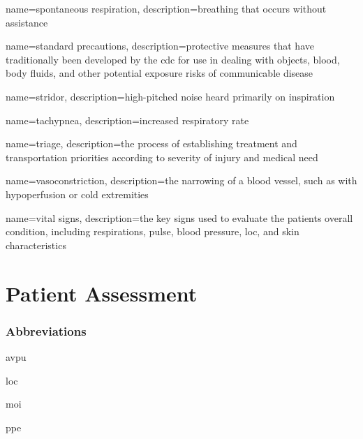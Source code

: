 \documentclass[../../EMT-169.tex]{subfiles}
\begin{document}
	{
		name=spontaneous respiration,
		description={breathing that occurs without assistance}
	}

	{
		name=standard precautions,
		description={protective measures that have traditionally been developed by the \acrfull{cdc} for use in dealing with objects, blood, body fluids, and other potential exposure risks of communicable disease}
	}
	
	{
		name=stridor,
		description={high-pitched noise heard primarily on inspiration}
	}
	
	{
		name=tachypnea,
		description={increased respiratory rate}
	}
	
	{
		name=triage,
		description={the process of establishing treatment and transportation priorities according to severity of injury and medical need}
	}

	{
		name=vasoconstriction,
		description={the narrowing of a blood vessel, such as with hypoperfusion or cold extremities}
	}	

	{
		name=vital signs,
		description={the key signs used to evaluate the patients overall condition, including respirations, pulse, blood pressure, \acrfull{loc}, and skin characteristics}
	}

	
\chapter{Patient Assessment}

\subsection*{Abbreviations}
\begin{description}[leftmargin=!,labelwidth=\widthof{\bfseries ABCDEF}]
	\item [\acrshort{avpu}] 		\acrlong{avpu}
	\item [\acrshort{loc}] 			\acrlong{loc}
	\item [\acrshort{moi}] 			\acrlong{moi}
	\item [\acrshort{ppe}] 			\acrlong{ppe}
\end{description}\hfill \\
\end{document}
